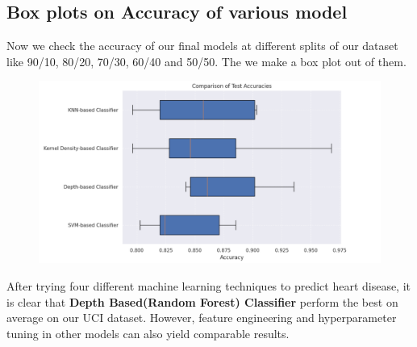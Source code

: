 \documentclass{article}
\begin{document}
\subsection{Box plots on Accuracy of various model}
Now we check the accuracy of our final models at different splits of our dataset like 90/10, 80/20, 70/30, 60/40 and 50/50.
The we make a box plot out of them.
\begin{figure}[h]
\centering
    \includegraphics[width=0.9\linewidth]{AccuracyBox.png}
\end{figure}

\noindent After trying four different machine learning techniques to predict heart disease, it is clear that \textbf{Depth Based(Random Forest) Classifier} perform the best on average on our UCI dataset. However, feature engineering and hyperparameter tuning in other models can also yield comparable results.
\end{document}
